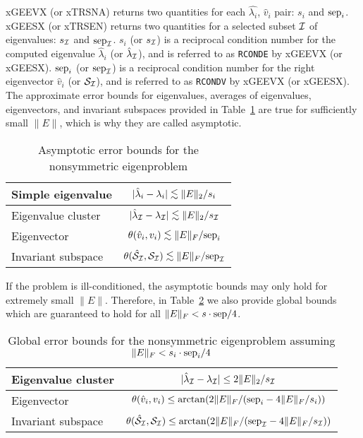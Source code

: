 xGEEVX (or xTRSNA) returns two quantities for each
$\hat{\lambda_i}$, $\hat{v}_i$ pair: $s_i$ and ${\rm sep}_i$.
xGEESX (or xTRSEN) returns two quantities for a selected subset
$\cal I$ of eigenvalues: $s_{\cal I}$ and ${\rm sep}_{\cal I}$.
$s_i$ (or $s_{\cal I}$) is a reciprocal condition number for the
computed eigenvalue $\hat{\lambda}_i$ (or $\hat{\lambda}_{\cal I}$),
and is referred to as {\tt RCONDE} by xGEEVX (or xGEESX).
${\rm sep}_i$ (or ${\rm sep}_{\cal I}$) is a reciprocal condition number for
the right eigenvector $\hat{v}_i$ (or ${\cal S}_{\cal I}$), and
is referred to as {\tt RCONDV} by xGEEVX (or xGEESX).
The approximate error bounds for eigenvalues, averages of eigenvalues,
eigenvectors, and invariant subspaces
provided in Table~\ref{tabasympnepbounds} are
true for sufficiently small $\|E\|$, which is why they are called asymptotic.

\begin{table}[h]
\caption{Asymptotic error bounds for the nonsymmetric eigenproblem}
\label{tabasympnepbounds}
\begin{center}
\begin{tabular}{|l|c|}
\hline
Simple eigenvalue &
$|\hat{\lambda}_i - \lambda_i | \leapproxeq \|E\|_2 / s_i$ \\ \hline
Eigenvalue cluster &
$|\hat{\lambda}_{\cal I} - \lambda_{\cal I} | \leapproxeq \|E\|_2 / s_{\cal I}$ \\ \hline
Eigenvector &
$\theta ( \hat{v}_i , v_i ) \leapproxeq \|E\|_F / \sep_i$ \\ \hline
Invariant subspace &
$\theta ( \hatcalSI , \calSI ) \leapproxeq \|E\|_F / \sep_{\cal I}$ \\ \hline
\end{tabular}
\end{center}
\end{table}

If the problem is ill-conditioned, the asymptotic bounds may only hold
for extremely small $\|E\|$. Therefore, in Table~\ref{tabglobalnepbounds}
we also provide global bounds
which are guaranteed to hold for all $\|E\|_F < s \cdot {\rm sep} / 4$.

\begin{table}[h]
\caption{Global error bounds for the nonsymmetric eigenproblem
assuming $\|E\|_F < s_i \cdot {\rm sep}_i / 4$}
\label{tabglobalnepbounds}
\begin{center}
\begin{tabular}{|l|c|}
\hline
Eigenvalue cluster &
$|\hat{\lambda}_{\cal I} - \lambda_{\cal I} | \leq 2 \|E\|_2 / s_{\cal I}$
\\ \hline
Eigenvector &
$\theta ( \hat{v}_i , v_i ) \leq \arctan (2 \|E\|_F/({\rm sep}_i - 4 \|E\|_F/s_i))$
\\ \hline
Invariant subspace &
$\theta ( {\hat{\cal S}}_{\cal I} , {\cal S}_{\cal I} ) \leq \arctan (2 \|E\|_F/({\rm sep}_{\cal I} - 4 \|E\|_F/s_{\cal I}))$
\\ \hline
\end{tabular}
\end{center}
\end{table}

